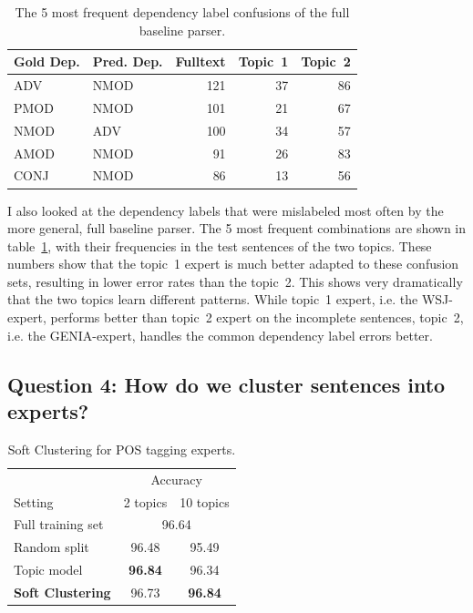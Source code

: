\begin{table}[t]
\centering
\begin{tabular}{ll|rrr}

Gold Dep. & Pred. Dep. & Fulltext  &Topic~1  & Topic~2 \\ \hline
ADV & NMOD & 121 & 37 & 86\\
PMOD & NMOD & 101 & 21& 67\\
NMOD & ADV & 100 & 34 & 57 \\
AMOD & NMOD & 91 & 26 & 83\\
CONJ & NMOD & 86 & 13 & 56\\ \hline
\end{tabular}
\caption{The 5 most frequent dependency label confusions of the full baseline parser.}
\label{tab:conf:FT:TM}
\end{table}

I also looked at the dependency labels that were mislabeled most often by the more general, full baseline parser. The 5 most frequent combinations are shown in table~\ref{tab:conf:FT:TM}, with their frequencies in the test sentences of the two topics. These numbers show that the topic~1 expert is much better adapted to these confusion sets, resulting in lower error rates than the topic~2. This shows very dramatically that the two topics learn different patterns. While topic~1 expert, i.e. the WSJ-expert, performs better than topic~2 expert on the incomplete sentences, topic~2, i.e. the GENIA-expert, handles the common dependency label errors better.



\subsection{Question 4: How do we cluster sentences into experts? }

\begin{table}[t]
\centering
\begin{tabular}{l|cc}
 & \multicolumn{2}{c}{Accuracy} \\
Setting & \multicolumn{1}{r}{2 topics} & \multicolumn{1}{r}{10 topics} \\ \hline
Full training set & \multicolumn{2}{c}{96.64} \\
Random split & 96.48 & 95.49 \\
Topic model & \textbf{96.84} & 96.34 \\ 
\textbf{Soft Clustering} & 96.73 & \textbf{96.84} \\ \hline
\end{tabular}
\caption{Soft Clustering for POS tagging experts.\label{tab:poswsoftcluster}}
\end{table}


